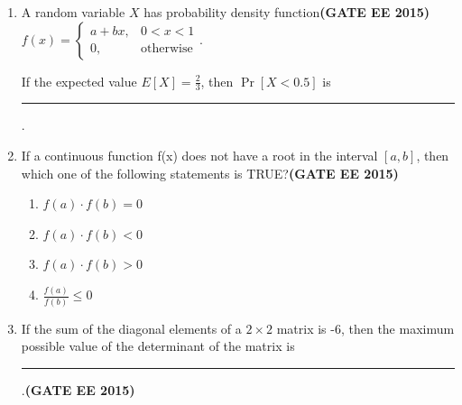 \documentclass[a4paper,12pt]{exam}
\theoremstyle{remark}
\begin{document}
\begin{enumerate}
What is the average of the marks obtained by the class in the examination?
\begin{multicols}{4}
\begin{enumerate}
  \item 2.290
  \item 2.970
  \item 6.795
  \item 8.795
\end{enumerate}
\end{multicols}
\\
Number of Questions:55\\
 Section Marks: 85\\
 \vspace{0.5cm
 }
\raggedright{ Q.11 to Q.35 carry 1 mark each \& Q.36 to Q.65 carry 2 marks each.}
\item A random variable    $X   $ has probability density function\hfill{\textbf{(GATE EE 2015)}}\\ $ f(x) = \begin{cases} a + bx, & 0 < x < 1 \\ 0, & \text{otherwise} \end{cases} $.

If the expected value $E[X] = \frac{2}{3}$, then $\Pr[X < 0.5]$ is \rule{3cm}{0.15mm}.

\item If a continuous function f(x) does not have a root in the interval $[a,b]$, then which one of the following statements is TRUE?\hfill{\textbf{(GATE EE 2015)}}

\begin{enumerate}
  \item    $f(a) \cdot f(b) = 0   $
  \item    $f(a) \cdot f(b) < 0   $
  \item    $f(a) \cdot f(b) > 0   $
  \item    $\frac{f(a)}{f(b)} \leq 0   $
\end{enumerate}

\item If the sum of the diagonal elements of a    $2 \times 2   $ matrix is -6, then the maximum possible value of the determinant of the matrix is \rule{3cm}{0.15mm}.\hfill{\textbf{(GATE EE 2015)}}


\end{enumerate}
\end{document}
